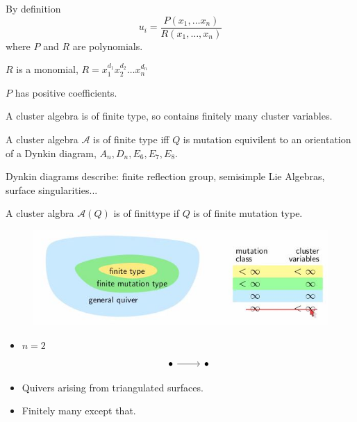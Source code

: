 \documentclass{article}
\begin{document}
By definition
$$ u_i = \frac{P(x_1, \dots x_n)}{R(x_1, \dots, x_n)} $$
where $P$ and $R$ are polynomials.

\begin{nthm}
  $R$ is a monomial, $R = x_1^{d_1}x_2^{d_2}\dots x_n^{d_n}$
\end{nthm}

\begin{nthm}[Positivity]
  $P$ has positive coefficients.
\end{nthm}

\begin{ndefi}[Finite]
  A cluster algebra is of finite type, so contains finitely many cluster variables.
\end{ndefi}

\begin{nthm}[]
  A cluster algebra $\mathcal{A}$ is of finite type iff $Q$ is mutation equivilent to an orientation of a Dynkin diagram, $A_n, D_n, E_6, E_7, E_8$.
\end{nthm}

Dynkin diagrams describe: finite reflection group, semisimple Lie Algebras, surface singularities...

A cluster algbra $\mathcal{A}(Q)$ is of finittype if $Q$ is of finite mutation type.

\begin{figure}[!ht]
\centering
\includegraphics{./figures/L3.6}
\end{figure}

\begin{eg}
  \begin{itemize}
    \item $n= 2$
    \[\begin{tikzcd}
	\bullet & \bullet
	\arrow[from=1-1, to=1-2]
\end{tikzcd}\]
    \item Quivers arising from triangulated surfaces.
    \item Finitely many except that.
  \end{itemize}
\end{eg}
\end{document}
